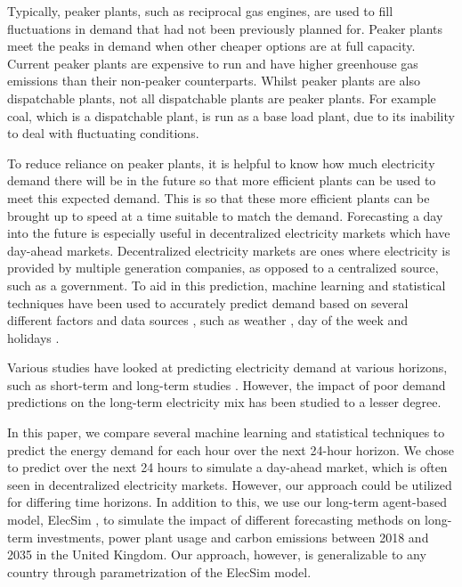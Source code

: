 \documentclass[final,3p,times,twocolumn,numbers]{elsarticle}
\begin{document}
Typically, peaker plants, such as reciprocal gas engines, are used to fill fluctuations in demand that had not been previously planned for. Peaker plants meet the peaks in demand when other cheaper options are at full capacity. Current peaker plants are expensive to run and have higher greenhouse gas emissions than their non-peaker counterparts. Whilst peaker plants are also dispatchable plants, not all dispatchable plants are peaker plants. For example coal, which is a dispatchable plant, is run as a base load plant, due to its inability to deal with fluctuating conditions.

To reduce reliance on peaker plants, it is helpful to know how much electricity demand there will be in the future so that more efficient plants can be used to meet this expected demand. This is so that these more efficient plants can be brought up to speed at a time suitable to match the demand. Forecasting a day into the future is especially useful in decentralized electricity markets which have day-ahead markets. Decentralized electricity markets are ones where electricity is provided by multiple generation companies, as opposed to a centralized source, such as a government. To aid in this prediction, machine learning and statistical techniques have been used to accurately predict demand based on several different factors and data sources \cite{Kell2018a}, such as weather \cite{Hong2014}, day of the week \cite{Al-Musaylh2018} and holidays \cite{Vrablecova2017}. 




Various studies have looked at predicting electricity demand at various horizons, such as short-term \cite{Huang2003} and long-term studies \cite{Andersen2013}. However, the impact of poor demand predictions on the long-term electricity mix has been studied to a lesser degree.

In this paper, we compare several machine learning and statistical techniques to predict the energy demand for each hour over the next 24-hour horizon. We chose to predict over the next 24 hours to simulate a day-ahead market, which is often seen in decentralized electricity markets. However, our approach could be utilized for differing time horizons. In addition to this, we use our long-term agent-based model, ElecSim \cite{Kell, Kell2020}, to simulate the impact of different forecasting methods on long-term investments, power plant usage and carbon emissions between 2018 and 2035 in the United Kingdom. Our approach, however, is generalizable to any country through parametrization of the ElecSim model.
\end{document}
